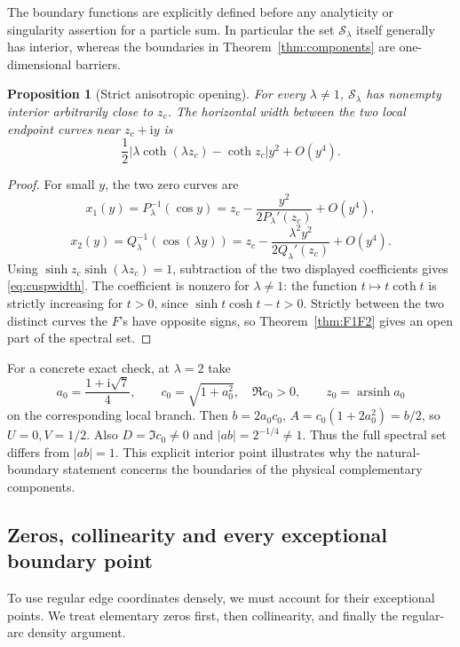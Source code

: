 \documentclass[11pt]{article}
\numberwithin{equation}{section}
\newtheorem{proposition}[theorem]{Proposition}
\theoremstyle{definition}
\newcommand{\ii}{\mathrm i}
\newcommand{\cS}{\mathcal S}
\begin{document}
The boundary functions are explicitly defined before any analyticity
or singularity assertion for a particle sum. In particular the set
\(\cS_\lambda\) itself generally has interior, whereas the boundaries
in Theorem~\ref{thm:components} are one-dimensional barriers.

\begin{proposition}[Strict anisotropic opening]\label{prop:anisotropicarea}
For every \(\lambda\ne1\), \(\cS_\lambda\) has nonempty interior
arbitrarily close to \(z_c\). The horizontal width between the two
local endpoint curves near \(z_c+\ii y\) is
\begin{equation}\label{eq:cuspwidth}
 \frac12\bigl|\lambda\coth(\lambda z_c)-\coth z_c\bigr|y^2
       +O(y^4).
\end{equation}
\end{proposition}
\begin{proof}
For small \(y\), the two zero curves are
\[
 x_1(y)=P_\lambda^{-1}(\cos y)
      =z_c-\frac{y^2}{2P_\lambda'(z_c)}+O(y^4),
\]
\[
 x_2(y)=Q_\lambda^{-1}(\cos(\lambda y))
      =z_c-\frac{\lambda^2y^2}{2Q_\lambda'(z_c)}+O(y^4).
\]
Using \(\sinh z_c\sinh(\lambda z_c)=1\), subtraction of the two
displayed coefficients gives \eqref{eq:cuspwidth}. The coefficient
is nonzero for \(\lambda\ne1\): the function
\(t\mapsto t\coth t\) is strictly increasing for \(t>0\), since
\(\sinh t\cosh t-t>0\). Strictly between the two distinct curves
the \(F\)'s have opposite signs, so Theorem~\ref{thm:F1F2} gives
an open part of the spectral set.
\end{proof}

For a concrete exact check, at \(\lambda=2\) take
\[
 a_0=\frac{1+\ii\sqrt7}{4},\qquad c_0=\sqrt{1+a_0^2},\quad
 \Re c_0>0,\qquad z_0=\operatorname{arsinh}a_0
\]
on the corresponding local branch. Then \(b=2a_0c_0\),
\(A=c_0(1+2a_0^2)=b/2\), so \(U=0,V=1/2\).
Also \(D=\Im c_0\ne0\) and \(|ab|=2^{-1/4}\ne1\).
Thus the full spectral set differs from \(|ab|=1\). This explicit
interior point illustrates why the natural-boundary statement concerns
the boundaries of the physical complementary components.

\subsection{Zeros, collinearity and every exceptional boundary point}

To use regular edge coordinates densely, we must account for their
exceptional points. We treat elementary zeros first, then collinearity,
and finally the regular-arc density argument.
\end{document}
